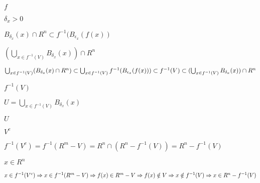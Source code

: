 \documentclass{article}
\def\lthtmlcheckvsize{\ifdim\ht\sizebox<\vsize 
  \ifdim\wd\sizebox<\hsize\expandafter\hfill\fi \expandafter\vfill
  \else\expandafter\vss\fi}%
\begin{document}
{\newpage\clearpage
{}%
$ f$%
\lthtmlindisplaymathZ
\lthtmlcheckvsize\clearpage}

{\newpage\clearpage
{}%
$ \delta_x>0$%
\lthtmlindisplaymathZ
\lthtmlcheckvsize\clearpage}

{\newpage\clearpage
{}%
$ B_{\delta_x}(x)\cap R^n \subset f^{-1}(B_{\epsilon_x}(f(x))$%
\lthtmlindisplaymathZ
\lthtmlcheckvsize\clearpage}

{\newpage\clearpage
{}%
$ (\bigcup_{x\in f^{-1}(V)}B_{\delta_x}(x))\cap R^n$%
\lthtmlindisplaymathZ
\lthtmlcheckvsize\clearpage}

{\newpage\clearpage
{}%
$ \bigcup_{x\in f^{-1}(V)}(B_{\delta_x}(x)\cap R^n)\subset\bigcup_{x\in f^{-1}(V)}f^{-1}(B_{\epsilon_x}(f(x)))\\\subset f^{-1}(V)\subset(\bigcup_{x\in f^{-1}(V)}B_{\delta_x}(x))\cap R^n$%
\lthtmlindisplaymathZ
\lthtmlcheckvsize\clearpage}

{\newpage\clearpage
{}%
$ f^{-1}(V)$%
\lthtmlindisplaymathZ
\lthtmlcheckvsize\clearpage}

{\newpage\clearpage
{}%
$ U=\bigcup_{x\in f^{-1}(V)}B_{\delta_x}(x)$%
\lthtmlindisplaymathZ
\lthtmlcheckvsize\clearpage}

{\newpage\clearpage
{}%
$ U$%
\lthtmlindisplaymathZ
\lthtmlcheckvsize\clearpage}

{\newpage\clearpage
{}%
$ V^c$%
\lthtmlindisplaymathZ
\lthtmlcheckvsize\clearpage}

{\newpage\clearpage
{}%
$ f^{-1}(V^c) = f^{-1}(R^m-V) = R^n\cap(R^n-f^{-1}(V))=R^n-f^{-1}(V)$%
\lthtmlindisplaymathZ
\lthtmlcheckvsize\clearpage}

{\newpage\clearpage
{}%
$ x\in R^n$%
\lthtmlindisplaymathZ
\lthtmlcheckvsize\clearpage}

{\newpage\clearpage
{}%
$ x\in f^{-1}(V^c)\Rightarrow x\in f^{-1}(R^m-V)\Rightarrow f(x)\in R^m-V
\\\Rightarrow f(x)\notin V\Rightarrow x\notin f^{-1}(V)\Rightarrow x\in R^n-f^{-1}(V)$%
\lthtmlindisplaymathZ
\lthtmlcheckvsize\clearpage}
\end{document}
